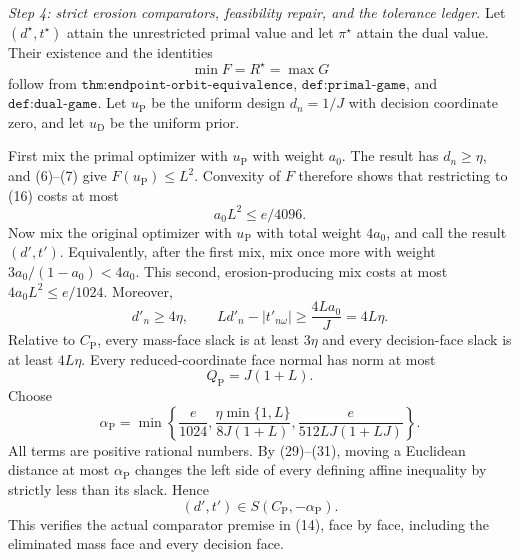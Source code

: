 \emph{Step 4: strict erosion comparators, feasibility repair, and the tolerance ledger.}
Let \((d^\star,t^\star)\) attain the unrestricted primal value and let \(\pi^\star\) attain the dual value.  Their existence and the identities
\[
 \min F=R^\star=\max G
\tag{27}
\]
follow from \(\texttt{thm:endpoint-orbit-equivalence}\), \(\texttt{def:primal-game}\), and \(\texttt{def:dual-game}\).  Let \(u_{\mathrm P}\) be the uniform design \(d_n=1/J\) with decision coordinate zero, and let \(u_{\mathrm D}\) be the uniform prior.

First mix the primal optimizer with \(u_{\mathrm P}\) with weight \(a_0\).  The result has \(d_n\ge\eta\), and (6)--(7) give \(F(u_{\mathrm P})\le L^2\).  Convexity of \(F\) therefore shows that restricting to (16) costs at most
\[
 a_0L^2\le e/4096.
\tag{28}
\]
Now mix the original optimizer with \(u_{\mathrm P}\) with total weight \(4a_0\), and call the result \((d',t')\).  Equivalently, after the first mix, mix once more with weight \(3a_0/(1-a_0)<4a_0\).  This second, erosion-producing mix costs at most \(4a_0L^2\le e/1024\).  Moreover,
\[
 d'_n\ge4\eta,
 \qquad
 Ld'_n-|t'_{n\omega}|\ge \frac{4La_0}{J}=4L\eta.
\tag{29}
\]
Relative to \(C_{\mathrm P}\), every mass-face slack is at least \(3\eta\) and every decision-face slack is at least \(4L\eta\).  Every reduced-coordinate face normal has norm at most
\[
 Q_{\mathrm P}=J(1+L).
\tag{30}
\]
Choose
\[
 \alpha_{\mathrm P}=\min\left\{
   \frac e{1024},
   \frac{\eta\min\{1,L\}}{8J(1+L)},
   \frac e{512LJ(1+LJ)}
 \right\}.
\tag{31}
\]
All terms are positive rational numbers.  By (29)--(31), moving a Euclidean distance at most \(\alpha_{\mathrm P}\) changes the left side of every defining affine inequality by strictly less than its slack.  Hence
\[
 (d',t')\in S(C_{\mathrm P},-\alpha_{\mathrm P}).
\tag{32}
\]
This verifies the actual comparator premise in (14), face by face, including the eliminated mass face and every decision face.

